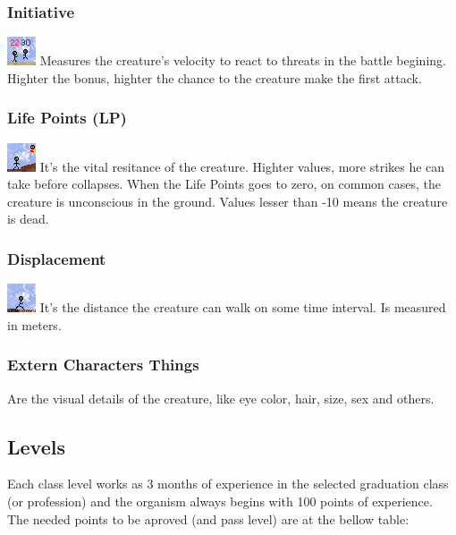 \documentclass[ letterpaper,12pt]{article}
\begin{document}
\subsubsection{Initiative}
\includegraphics{../data/skills/Img/iniciativa.png}
Measures the creature's velocity to react to threats in the battle begining.
Highter the bonus, highter the chance to the creature make the first attack.

\subsubsection{Life Points (LP)}
\includegraphics{../data/skills/Img/pv.png}
It's the vital resitance of the creature. Highter values, more strikes he can
take before collapses. When the Life Points goes to zero, on common cases, the
creature is unconscious in the ground. Values lesser than -10 means the
creature is dead.

\subsubsection{Displacement}
\includegraphics{../data/skills/Img/deslocamento.png}
It's the distance the creature can walk on some time interval. Is measured in meters.

\subsubsection{Extern Characters Things}
Are the visual details of the creature, like eye color, hair, size, sex and others.

\subsection{Levels}
Each class level works as 3 months of experience in the selected graduation class
(or profession) and the organism always begins with 100 points of experience.\\
The needed points to be aproved (and pass level) are at the bellow table:
\end{document}
